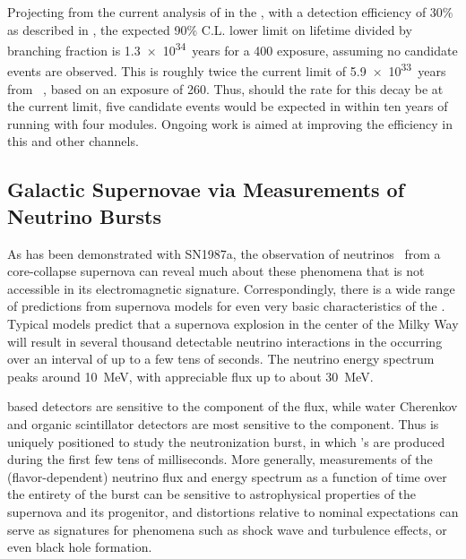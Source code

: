 Projecting from the current analysis of \ptoknubar in the  
, with a detection efficiency of \num{30}\% as 
described in \physchndk, the 
expected 90\% C.L. lower limit on lifetime divided by branching 
fraction is \SI{1.3e34}{years} for a  \SI{400}{\ktyr} 
exposure, assuming no candidate events are observed.  This 
is roughly twice the current limit of 
\SI{5.9e33}{years} from \superk~\cite{Abe:2014mwa}, 
based on an exposure of \SI{260}{\ktyr}.  Thus, should the rate 
for this decay be at the current \superk limit, five candidate 
events would be expected in  within ten years 
of running with four  modules.  Ongoing work is aimed 
at improving the efficiency in this and other channels.

\subsection{Galactic Supernovae via Measurements of Neutrino Bursts}
\label{sec:es:phys:galact}

As has been demonstrated with SN1987a, the observation 
of neutrinos~\cite{Bionta:1987qt,Hirata:1987hu} from a 
core-collapse supernova can reveal much about these  
phenomena that is not accessible in its  
electromagnetic signature.  Correspondingly, there is a 
wide range of predictions from supernova models for even 
very basic characteristics of the .  Typical  
models predict that a supernova explosion in the 
center of the Milky Way will result in several thousand 
detectable neutrino interactions in the   
occurring over an interval of up to a few tens of seconds.
The neutrino energy spectrum peaks around \SI{10}{\MeV}, 
with appreciable flux up to about \SI{30}{\MeV}.

 based detectors are sensitive to the \nue 
component of the flux, while water Cherenkov and organic 
scintillator detectors are most sensitive to the \anue 
component.  Thus  is uniquely %
positioned to study the 
neutronization burst, in which \nue's are produced during the 
first few tens of milliseconds.  More generally,  
measurements of the (flavor-dependent) neutrino flux and energy 
spectrum as a function of time over the entirety of the burst 
can be sensitive to astrophysical properties of the supernova 
and its progenitor, and distortions relative to nominal 
expectations can serve as signatures for phenomena such 
as shock wave and turbulence effects, or even black hole 
formation.  

